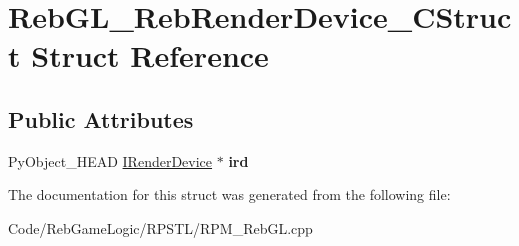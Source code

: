 \hypertarget{struct_reb_g_l___reb_render_device___c_struct}{}\section{Reb\+G\+L\+\_\+\+Reb\+Render\+Device\+\_\+\+C\+Struct Struct Reference}
\label{struct_reb_g_l___reb_render_device___c_struct}
\subsection*{Public Attributes}
\begin{DoxyCompactItemize}
\item 
Py\+Object\+\_\+\+H\+E\+AD \hyperlink{class_i_render_device}{I\+Render\+Device} $\ast$ {\bfseries ird}\hypertarget{struct_reb_g_l___reb_render_device___c_struct_a79826a2f24016b707329d003bec304f5}{}\label{struct_reb_g_l___reb_render_device___c_struct_a79826a2f24016b707329d003bec304f5}

\end{DoxyCompactItemize}


The documentation for this struct was generated from the following file\+:\begin{DoxyCompactItemize}
\item 
Code/\+Reb\+Game\+Logic/\+R\+P\+S\+T\+L/R\+P\+M\+\_\+\+Reb\+G\+L.\+cpp\end{DoxyCompactItemize}
